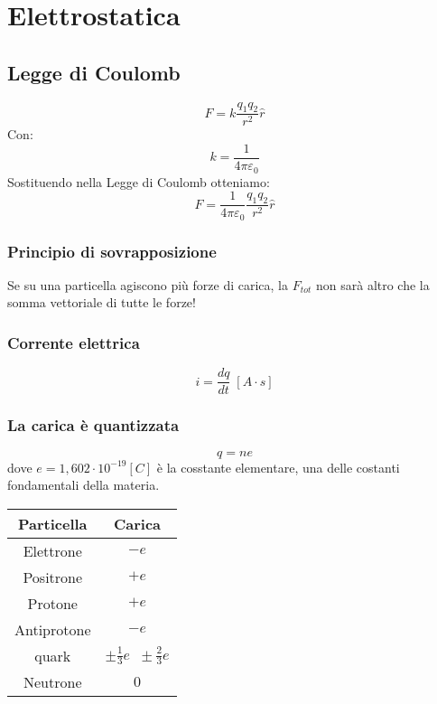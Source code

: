 \chapter*{Elettrostatica}

    \section*{Legge di Coulomb}
        \begin{equation*}
            F = k\frac{q_1q_2}{r^2}\widehat{r}
        \end{equation*}
    Con:
    \begin{equation*}
        k = \frac{1}{4\pi\varepsilon_0}
    \end{equation*}
    Sostituendo nella Legge di Coulomb otteniamo:
    \begin{equation*}
        F = \frac{1}{4\pi\varepsilon_0}\frac{q_1q_2}{r^2}\widehat{r}
    \end{equation*}
        \subsection*{Principio di sovrapposizione}
        Se su una particella agiscono più forze di carica, la $F_{tot}$ non 
        sarà altro che la somma vettoriale di tutte le forze!

        \subsection*{Corrente elettrica}
            \begin{equation*}
                i = \frac{dq}{dt} \; [A \cdot s]
            \end{equation*}
    
        \subsection*{La carica è quantizzata} 
            \begin{equation*}
                q = ne
            \end{equation*}
        dove $e = 1,602\cdot10^{-19} [C]$ è la cosstante elementare, una delle
        costanti fondamentali della materia.
        \begin{center}
            \begin{tabular}{ |c|c| } 
                \hline
                Particella & Carica \\
                \hline
                Elettrone & $- e$ \\
                Positrone & $+ e$ \\
                Protone & $+ e$ \\
                Antiprotone & $- e$ \\
                quark & $\pm \frac{1}{3}e \;\; \pm \frac{2}{3}e$ \\
                Neutrone & $0$ \\
                \hline
            \end{tabular}
        \end{center}

